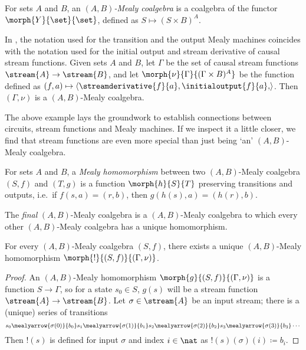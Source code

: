 \begin{definition}
    For sets \(A\) and \(B\), an \emph{\((A,B)\)-Mealy coalgebra} is a coalgebra
    of the functor \(\morph{Y}{\set}{\set}\), defined as
    \(S \mapsto (S \times B)^A\).
\end{definition}

\begin{example}
    In \cite{bonsangue2008coalgebraic}, the notation used for the transition
    and the output Mealy machines coincides with the notation used for
    the initial output and stream derivative of causal stream functions.
    Given sets \(A\) and \(B\), let \(\Gamma\) be the set of causal stream
    functions \(\stream{A} \to \stream{B}\), and let
    \(\morph{\nu}{\Gamma}{(\Gamma \times B)^A}\) be the function defined as \(
    (f, a) \mapsto \langle{\streamderivative{f}{a},\initialoutput{f}{a},}\rangle
    \).
    Then \((\Gamma,\nu)\) is a \((A,B)\)-Mealy coalgebra.
\end{example}

The above example lays the groundwork to establish connections between circuits,
stream functions and Mealy machines.
If we inspect it a little closer, we find that stream functions are even more
special than just being `an' \((A,B)\)-Mealy coalgebra.

\begin{definition}\label{def:mealy-homomorphism}
    For sets \(A\) and \(B\), a \emph{Mealy homomorphism} between two
    \((A,B)\)-Mealy coalgebra \((S,f)\) and \((T,g)\) is a function
    \(\morph{h}{S}{T}\) preserving transitions and
    outputs, i.e.\ if \(f(s,a) = (r,b)\), then \(g(h(s),a) = (h(r),b)\).
\end{definition}

The \emph{final} \((A,B)\)-Mealy coalgebra is a \((A,B)\)-Mealy coalgebra to
which every other \((A,B)\)-Mealy coalgebra has a unique homomorphism.

\begin{proposition}
    \label{prop:final-coalgebra}
    For every \((A,B)\)-Mealy coalgebra \((S,f)\), there exists a
    unique \((A,B)\)-Mealy homomorphism \(\morph{{!}}{(S,f)}{(\Gamma,\nu)}\).
\end{proposition}
\begin{proof}
    An \((A,B)\)-Mealy homomorphism \(\morph{g}{(S, f)}{(\Gamma, \nu)}\) is a
    function \(S \to \Gamma\), so for a state \(s_0 \in S\), \(g(s)\) will be a
    stream function \(\stream{A} \to \stream{B}\).
    Let \(\sigma \in \stream{A}\) be an input stream; there is a (unique) series
    of transitions \[
        s_0
        \mealyarrow{\sigma(0)}{b_0}
        s_1
        \mealyarrow{\sigma(1)}{b_1}
        s_2
        \mealyarrow{\sigma(2)}{b_2}
        s_3
        \mealyarrow{\sigma(3)}{b_3}
        \cdots
    \]
    Then \(!(s)\) is defined for input \(\sigma\) and
    index \(i \in \nat\) as \(!(s)(\sigma)(i) \coloneqq b_i\).
\end{proof}

